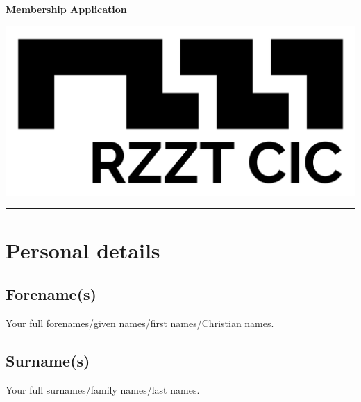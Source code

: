 \documentclass[a4paper,10pt]{article}
\begin{document}
\thispagestyle{firstpage}

\begin{Form}

\begin{minipage}[b]{0.75\textwidth}
  \LARGE\textbf{{Membership Application}}
  \vspace{0.05em}
\end{minipage}
%
\begin{minipage}[b]{0.25\textwidth}
  \raggedleft
  \includegraphics[width=1\textwidth]{logo-black.jpg}
\end{minipage}

\hrule

\vspace{2em}

\section{Personal details}

\subsection{Forename(s)}

Your full forenames/given names/first names/Christian names.

\begin{framed}%
  \TextField[width=\textwidth,maxlen=75,donotscroll=true,name=forename]{ }%
\end{framed}%

\subsection{Surname(s)}

Your full surnames/family names/last names.

\begin{framed}%
  \TextField[width=\textwidth,donotscroll=true,name=surname]{ }%
\end{framed}%


\end{Form}
\end{document}
